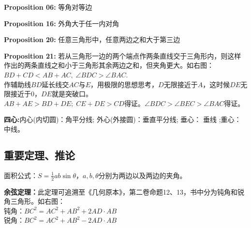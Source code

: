 \documentclass[../main.tex]{subfiles}
\begin{document}
\textbf{Proposition 06:} 等角对等边

\textbf{Proposition 16:} 外角大于任一内对角

\textbf{Proposition 20:} 任意三角形中，任意两边之和大于第三边


\begin{minipage}{0.7\textwidth}
  \textbf{Proposition 21:} 若从三角形一边的两个端点作两条直线交于三角形内，则这样作出的两条直线之和小于三角形其余两边之和，但夹角更大。如右图：
  $BD+CD < AB+AC, \; \angle BDC> \angle BAC$.\\
  作辅助线$BD$延长线交$AC$与$E$，用极限的思想思考，$D$无限接近于$A$，这时候$DE$无限接近于$0$，$DE$就是突破口。\\
  $AB+AE>BD+DE; \; CE+DE>CD$得证。$\angle BDC>\angle BEC>\angle BAC$得证。
\end{minipage}
\begin{minipage}{0.3\textwidth}
  \centering
\end{minipage}

\textbf{四心:}内心(内切圆)：角平分线; 外心(外接圆)：垂直平分线; 垂心： 垂线 ;重心： 中线。

\subsection{重要定理、推论}

面积公式：$S=\frac{1}{2}ab\sin\theta$，$a,b,\theta$分别为两边以及两边的夹角。

\begin{minipage}{0.6\textwidth}
  \textbf{余弦定理：}此定理可追溯至《几何原本》，第二卷命题12、13，书中分为钝角和锐角三角形。如右图：\\
  钝角：$BC^2=AC^2+AB^2+2AD\cdot AB$\\
  锐角：$BC^2=AC^2+AB^2-2AD\cdot AB$
\end{minipage}
\begin{minipage}{0.4\textwidth}
  \centering
\end{minipage}
\end{document}
